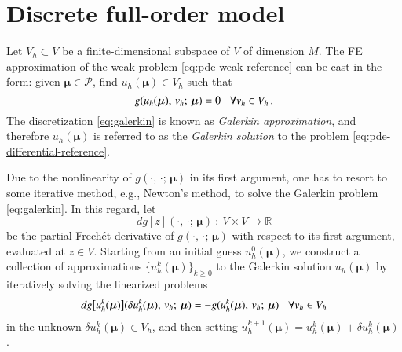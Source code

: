 \documentclass{elsarticle}
\theoremstyle{theorem}
\theoremstyle{definition}
\theoremstyle{remark}
\theoremstyle{proposition}
\numberwithin{figure}{section}
\newcommand{\bg}[1]{\boldsymbol{#1}}
\begin{document}
	
	
	\section{Discrete full-order model}
	\label{section:Discrete full-order model}
	
		Let $V_h \subset V$ be a finite-dimensional subspace of $V$ of dimension $M$. The FE approximation of the weak problem \eqref{eq:pde-weak-reference} can be cast in the form: given $\bg{\mu} \in \mathcal{P}$, find $u_h(\bg{\mu}) \in V_h$ such that 
		\begin{equation}
			\label{eq:galerkin}
			g(u_h(\bg{\mu}), \, v_h; \, \bg{\mu}) = 0 \hspace*{0.3cm} \forall v_h \in V_h \, .
		\end{equation}
		The discretization \eqref{eq:galerkin} is known as \emph{Galerkin approximation}, and therefore $u_h(\bg{\mu})$ is referred to as the \emph{Galerkin solution} to the problem \eqref{eq:pde-differential-reference}. 
		
		Due to the nonlinearity of $g(\cdot, \, \cdot; \, \bg{\mu})$ in its first argument, one has to resort to some iterative method, e.g., Newton's method, to solve the Galerkin problem \eqref{eq:galerkin}. In this regard, let \[ dg[z](\cdot, \, \cdot; \, \bg{\mu}) ~ : ~ V \times V \rightarrow \mathbb{R} \]
		be the partial Frech\'et derivative of $g(\cdot, \, \cdot; \, \bg{\mu})$ with respect to its first argument, evaluated at $z \in V$. Starting from an initial guess $u_h^0(\bg{\mu})$, we construct a collection of approximations $\big\lbrace u_h^k(\bg{\mu}) \big\rbrace_{k \geq 0}$ to the Galerkin solution $u_h(\bg{\mu})$ by iteratively solving the linearized problems
		\begin{equation*}
			\label{eq:newton-linearized-problem}
			dg \big[ u_h^k(\bg{\mu}) \big](\delta u_h^k(\bg{\mu}), \, v_h; \, \bg{\mu}) = - g(u_h^k(\bg{\mu}), \, v_h; \, \bg{\mu}) \hspace*{0.3cm} \forall v_h \in V_h
		\end{equation*}
		in the unknown $\delta u_h^k(\bg{\mu}) \in V_h$, and then setting $u_h^{k+1}(\bg{\mu}) = u_h^k(\bg{\mu}) + \delta u_h^k(\bg{\mu})$.
		
\end{document}
